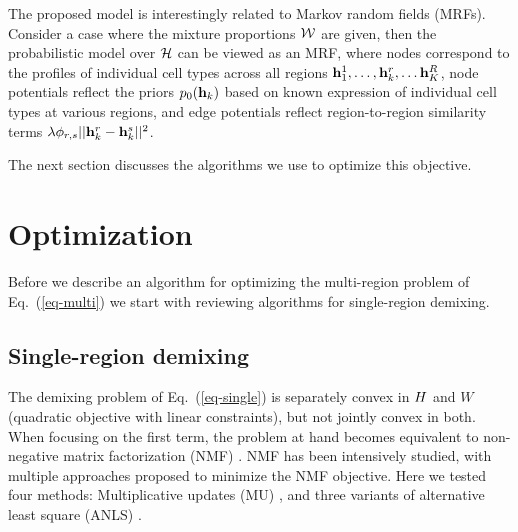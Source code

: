 \documentclass{article} %
\newcommand{\W}{W}
\renewcommand{\eqref}[1]{Eq.~(\ref{#1})}
\begin{document}
The proposed model is interestingly related to Markov random fields (MRFs). Consider a case where the mixture proportions $\cal{W}$ are given, then the probabilistic model over $\cal{{H}}$ can be viewed as an MRF, where nodes correspond to the profiles of individual cell types across all regions $\mathbf{h}^1_1,\ldots, \mathbf{h}^r_k, \ldots \mathbf{h}^R_K$, node potentials reflect the priors $p_0(\mathbf{h}_k)$ based on known expression of individual cell types at various regions, and edge potentials reflect region-to-region similarity terms $\lambda \phi_{r,s}|| \mathbf{h}^r_k - \mathbf{h}^s_k||^2$. 

The next section discusses the algorithms we use to optimize this objective.

\section{Optimization}
Before we describe an algorithm for optimizing the multi-region problem of \eqref{eq-multi} we start with reviewing algorithms for single-region demixing.

%

\subsection{Single-region demixing}
The demixing problem of \eqref{eq-single} is separately convex in ${H}$ and $\W$ (quadratic objective with linear constraints), but not jointly convex in both. When focusing on the first term, the problem at hand becomes equivalent to non-negative matrix factorization (NMF) \cite{leenmfs}. NMF has been intensively studied, with multiple approaches proposed to minimize the NMF objective. Here we tested four methods: Multiplicative updates (MU) \cite{leenmfs}, and three variants of alternative least square (ANLS) \cite{lin2007projected,kim2008activeset,kim2011fast}. 
\end{document}
